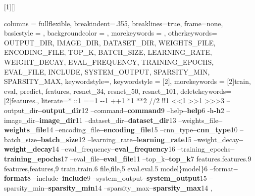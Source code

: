 \newcommand\pseudocodeinlinestyle{\lstset{
		basicstyle=\ttm%
}}

[1][]
{
\pseudocodestyle
\lstset{#1}
}
{}

\newcommand\pseudocodeexternal[2][]{{
\pseudocodestyle
}}

\newcommand\pseudocodeinline[1]{{\pseudocodestyle\pseudocodeinlinestyle\lstinline!#1!}}

\newcommand\paramstyle[1]{{\ttb\color{black}\bfseries{#1}}}%
{
	columns = fullflexible,%
	breakindent=.355\textwidth,
	breaklines=true,%
	frame=none,%
	basicstyle = \ttm,%
	backgroundcolor = \color{background},
	morekeywords = {},
	otherkeywords= {OUTPUT\_DIR, IMAGE\_DIR, DATASET\_DIR, WEIGHTS\_FILE, ENCODING\_FILE, TOP\_K,
	                BATCH\_SIZE, LEARNING\_RATE, WEIGHT\_DECAY, EVAL\_FREQUENCY, TRAINING\_EPOCHS, EVAL\_FILE,
                    INCLUDE, SYSTEM\_OUTPUT, SPARSITY\_MIN, SPARSITY\_MAX},
	keywordstyle=\ttb\color{deepred},%
%
	keywordstyle = [2]{\ttm\color{pgreen}},%
	morekeywords = [2]{train, eval, predict, features, resnet\_34, resnet\_50, resnet\_101},%
	deletekeywords=[2]{features.},%
%
	literate=*%
	{:}{{:}}{1}%
	{=}{{\literatecolour=}}{1}%
	{-}{{-}}{1}%
	{+}{{\literatecolour+}}{1}%
	{*}{{\literatecolour*}}{1}%
	{**}{{\literatecolour{**}}}2%
	{//}{{\literatecolour{//}}}2%
	{!}{{\literatecolour!}}{1}%
	{<}{{\literatecolour<}}{1}%
	{>}{{\literatecolour>}}{1}%
	{>>>}{\pseudocodeprompt}{3}%
	{--output\_dir}{\paramstyle{--output\_dir}}{12}%
	{--command}{\paramstyle{--command}}{9}%
	{--help}{\paramstyle{--help}}{6}%
	{-h}{\paramstyle{-h}}{2}%
	{--image\_dir}{\paramstyle{--image\_dir}}{11}%
	{--dataset\_dir}{\paramstyle{--dataset\_dir}}{13}%
	{--weights\_file}{\paramstyle{--weights\_file}}{14}%
	{--encoding\_file}{\paramstyle{--encoding\_file}}{15}%
	{--cnn\_type}{\paramstyle{--cnn\_type}}{10}%
	{--batch\_size}{\paramstyle{--batch\_size}}{12}%
	{--learning\_rate}{\paramstyle{--learning\_rate}}{15}%
	{--weight\_decay}{\paramstyle{--weight\_decay}}{14}%
	{--eval\_frequency}{\paramstyle{--eval\_frequency}}{16}%
	{--training\_epochs}{\paramstyle{--training\_epochs}}{17}%
	{--eval\_file}{\paramstyle{--eval\_file}}{11}%
	{--top\_k}{\paramstyle{--top\_k}}{7}%
	{features.}{{features.}}{9}%
	{features,}{{features,}}{9}%
	{train.}{{train.}}{6}%
	{file,}{{\ttm\color{pgreen}file},}{5}%
	{eval.}{{eval.}}{5}%
	{model\}}{{\ttm\color{pgreen}model}\}}{6}%
	{--format}{\paramstyle{--format}}{8}%
	{--include}{\paramstyle{--include}}{9}%
	{--system\_output}{\paramstyle{--system\_output}}{15}%
	{--sparsity\_min}{\paramstyle{--sparsity\_min}}{14}%
	{--sparsity\_max}{\paramstyle{--sparsity\_max}}{14}%
	,%
}


%